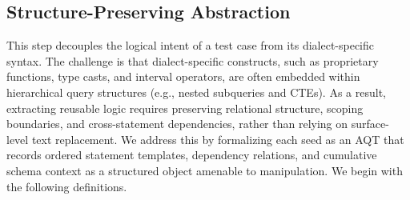 \documentclass[conference]{IEEEtran}
\begin{document}

\subsection{Structure-Preserving Abstraction}
\label{sec:abstraction}
This step decouples the logical intent of a test case from its dialect-specific syntax.
The challenge is that dialect-specific constructs, such as proprietary functions, type casts, and interval operators, are often embedded within hierarchical query structures (e.g., nested subqueries and CTEs).
As a result, extracting reusable logic requires preserving relational structure, scoping boundaries, and cross-statement dependencies, rather than relying on surface-level text replacement.
We address this by formalizing each seed as an AQT that records ordered statement templates, dependency relations, and cumulative schema context as a structured object amenable to manipulation.
We begin with the following definitions.
\end{document}
